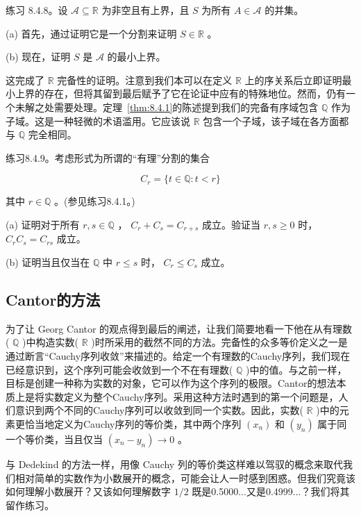 练习 8.4.8。设 \(\mathcal{A} \subseteq  \mathbb{R}\) 为非空且有上界，且 \(S\) 为所有 \(A \in  \mathcal{A}\) 的并集。

(a) 首先，通过证明它是一个分割来证明 \(S \in  \mathbb{R}\) 。

(b) 现在，证明 \(S\) 是 \(\mathcal{A}\) 的最小上界。

这完成了 \(\mathbb{R}\) 完备性的证明。注意到我们本可以在定义 \(\mathbb{R}\) 上的序关系后立即证明最小上界的存在，但将其留到最后赋予了它在论证中应有的特殊地位。然而，仍有一个未解之处需要处理。定理~\ref{thm:8.4.1}的陈述提到我们的完备有序域包含 \(\mathbb{Q}\) 作为子域。这是一种轻微的术语滥用。它应该说 \(\mathbb{R}\) 包含一个子域，该子域在各方面都与 \(\mathbb{Q}\) 完全相同。

练习8.4.9。考虑形式为所谓的“有理”分割的集合

\[
{C}_{r} = \{ t \in  \mathbb{Q} : t < r\}
\]

其中 \(r \in  \mathbb{Q}\) 。(参见练习8.4.1。)

(a) 证明对于所有 \(r,s \in  \mathbb{Q}\) ， \({C}_{r} + {C}_{s} = {C}_{r + s}\) 成立。验证当 \(r,s \geq  0\) 时， \({C}_{r}{C}_{s} = {C}_{rs}\) 成立。

(b) 证明当且仅当在 \(\mathbb{Q}\) 中 \(r \leq  s\) 时， \({C}_{r} \leq  {C}_{s}\) 成立。

\subsection{Cantor的方法}

为了让 Georg Cantor 的观点得到最后的阐述，让我们简要地看一下他在从有理数( \(\mathbb{Q}\) )中构造实数( \(\mathbb{R}\) )时所采用的截然不同的方法。完备性的众多等价定义之一是通过断言“Cauchy序列收敛”来描述的。给定一个有理数的Cauchy序列，我们现在已经意识到，这个序列可能会收敛到一个不在有理数( \(\mathbb{Q}\) )中的值。与之前一样，目标是创建一种称为实数的对象，它可以作为这个序列的极限。Cantor的想法本质上是将实数定义为整个Cauchy序列。采用这种方法时遇到的第一个问题是，人们意识到两个不同的Cauchy序列可以收敛到同一个实数。因此，实数( \(\mathbb{R}\) )中的元素更恰当地定义为Cauchy序列的等价类，其中两个序列 \(\left( {x}_{n}\right)\) 和 \(\left( {y}_{n}\right)\) 属于同一个等价类，当且仅当 \(\left( {{x}_{n} - {y}_{n}}\right)  \rightarrow  0\) 。

与 Dedekind 的方法一样，用像 Cauchy 列的等价类这样难以驾驭的概念来取代我们相对简单的实数作为小数展开的概念，可能会让人一时感到困惑。但我们究竟该如何理解小数展开？又该如何理解数字 \(1/2\) 既是0.5000...又是0.4999...？我们将其留作练习。
